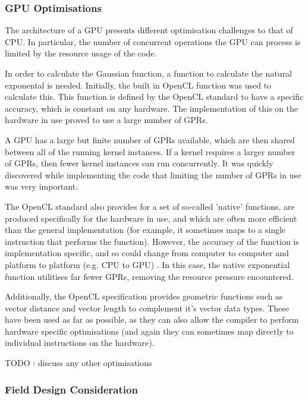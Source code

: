 \documentclass[10pt]{article} \usepackage[a4paper]{geometry}
\begin{document}
\subsubsection{\ac{GPU} Optimisations}

The architecture of a \ac{GPU} presents different optimisation challenges to
that of \ac{CPU}. In particular, the number of concurrent operations the
\ac{GPU} can process is limited by the resource usage of the code.

In order to calculate the Gaussian function, a function to calculate the natural
exponental is needed. Initially, the built in OpenCL function was used to
calculate this. This function is defined by the OpenCL standard to have a
specific accuracy, which is constant on any hardware. The implementation of this
on the hardware in use proved to use a large number of \acp{GPR}.

A \ac{GPU} has a large but finite number of \acp{GPR} available, which are then
shared between all of the running kernel instances. If a kernel requires a
larger number of \acp{GPR}, then fewer kernel instances can run concurrently. It
was quickly discovered while implementing the code that limiting the number of
\acp{GPR} in use was very important.

The OpenCL standard also provides for a set of so-called 'native' functions, are
produced specifically for the hardware in use, and which are often more
efficient than the general implementation (for example, it sometimes maps to a
single instruction that performs the function). However, the accuracy of the
function is implementation specific, and so could change from computer to
computer and platform to platform (e.g. \ac{CPU} to \ac{GPU})
\cite{openCl11Spec}. In this case, the native exponential function utilitises
far fewer \acp{GPR}, removing the resource pressure encountered.

Additionally, the OpenCL specification provides geometric functions such as
vector distance and vector length to complement it's vector data types. These
have been used as far as possible, as they can also allow the compiler to
perform hardware specific optimisations (and again they can sometimes map
directly to individual instructions on the hardware).\cite{openCl11Spec}

TODO : discuss any other optimisations

\subsubsection{Field Design Consideration}
\end{document}
